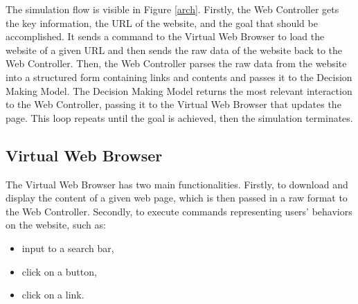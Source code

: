 The simulation flow is visible in Figure \ref{arch}. Firstly, the Web Controller gets the key information, the URL of the website, and the goal that should be accomplished. It sends a command to the Virtual Web Browser to load the website of a given URL and then sends the raw data of the website back to the Web Controller. Then, the Web Controller parses the raw data from the website into a structured form containing links and contents and passes it to the Decision Making Model. The Decision Making Model returns the most relevant interaction to the Web Controller, passing it to the Virtual Web Browser that updates the page. This loop repeats until the goal is achieved, then the simulation terminates. 



\subsection{Virtual Web Browser}
\label{vbc}

The Virtual Web Browser has two main functionalities. Firstly, to download and display the content of a given web page, which is then passed in a raw format to the Web Controller. Secondly, to execute commands representing users' behaviors on the website, such as:
\begin{itemize}
    \item input to a search bar,
    \item click on a button,
    \item click on a link.
\end{itemize}

